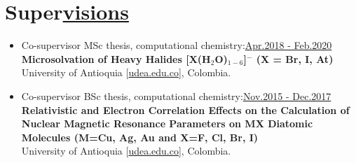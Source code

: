 \section{Super\href{.}{visions}}

\begin{itemize}
    \small

    \item Co-supervisor MSc thesis, computational chemistry:\hfill \href{.}{Apr.2018 - Feb.2020}\\
          \textbf{Microsolvation of Heavy Halides [X(H$_2$O)$_{1-6}$]$^-$ (X = Br, I, At)}\\
          University of Antioquia [\href{www.udea.edu.co}{udea.edu.co}],
          Colombia.


    \item Co-supervisor BSc thesis, computational chemistry:\hfill \href{.}{Nov.2015 - Dec.2017}\\
          \textbf{Relativistic and Electron Correlation Effects on the Calculation of Nuclear Magnetic Resonance Parameters on MX Diatomic Molecules (M=Cu, Ag, Au and X=F, Cl, Br, I)}\\
          University of Antioquia [\href{www.udea.edu.co}{udea.edu.co}],
          Colombia.

\end{itemize}


